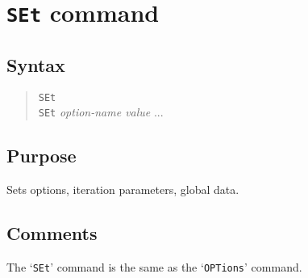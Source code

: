 %
%
%
%
\section{{\tt SEt} command}
\subsection{Syntax}
\begin{verse}
{\tt SEt}\\
{\tt SEt} {\it option-name value} ...
\end{verse}
\subsection{Purpose}

Sets options, iteration parameters, global data.
\subsection{Comments}

The `{\tt SEt}' command is the same as the `{\tt OPTions}' command.
